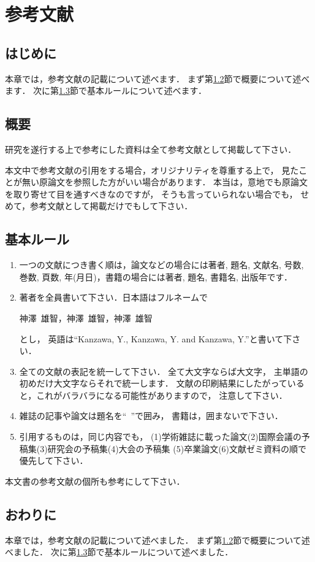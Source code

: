 \documentclass[a4j,12pt,dvipdfmx,oneside]{jsbook}
\theoremstyle{definition}
\begin{document}
\chapter{参考文献}\label{chap:cite}
%
%
%
\section{はじめに}\label{sec:cite_intro}
本章では，参考文献の記載について述べます．
まず第\ref{sec:cite_abst}節で概要について述べます．
次に第\ref{sec:cite_rule}節で基本ルールについて述べます．
%
%
%
\section{概要}\label{sec:cite_abst}
%
%
%
研究を遂行する上で参考にした資料は全て参考文献として掲載して下さい．

本文中で参考文献の引用をする場合，オリジナリティを尊重する上で，
見たことが無い原論文を参照した方がいい場合があります．
本当は，意地でも原論文を取り寄せて目を通すべきなのですが，
そうも言っていられない場合でも，
せめて，参考文献として掲載だけでもして下さい．
%
%
%
\section{基本ルール}\label{sec:cite_rule}
\begin{enumerate}
\item 一つの文献につき書く順は，論文などの場合には著者, 題名, 文献名, 号数, 巻数, 頁数, 年(月日)，書籍の場合には著者, 題名, 書籍名, 出版年です．
\item 著者を全員書いて下さい．日本語はフルネームで
\begin{center}
神澤~雄智，神澤~雄智，神澤~雄智
\end{center}
とし，
英語は``Kanzawa, Y., Kanzawa, Y. and Kanzawa, Y.''と書いて下さい．
\item 全ての文献の表記を統一して下さい．
全て大文字ならば大文字，
主単語の初めだけ大文字ならそれで統一します．
文献の印刷結果にしたがっていると，これがバラバラになる可能性がありますので，
注意して下さい．
\item 雑誌の記事や論文は題名を``\ ''で囲み，
書籍は，囲まないで下さい．
\item 引用するものは，同じ内容でも，
(1)学術雑誌に載った論文(2)国際会議の予稿集(3)研究会の予稿集(4)大会の予稿集
(5)卒業論文(6)文献ゼミ資料の順で優先して下さい．
\end{enumerate}
本文書の参考文献の個所も参考にして下さい．
%
%
%
\section{おわりに}\label{sec:cite_summary}
本章では，参考文献の記載について述べました．
まず第\ref{sec:cite_abst}節で概要について述べました．
次に第\ref{sec:cite_rule}節で基本ルールについて述べました．
%
%
%
\end{document}
